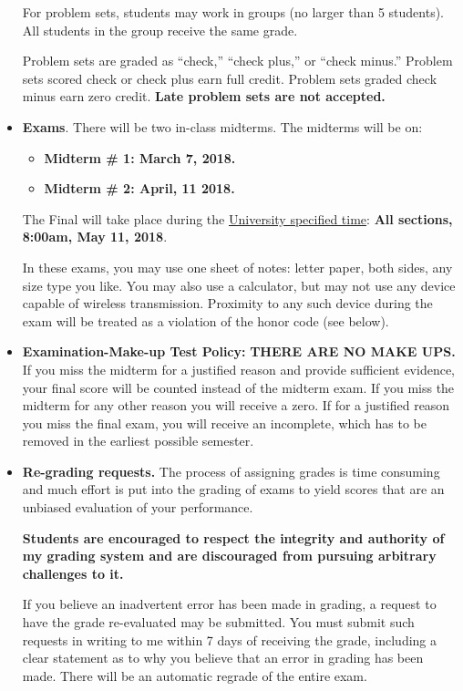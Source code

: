 \documentclass[12pt,pdftex,twoside,letterpaper]{exam}
\begin{document}
\begin{itemize}
    For problem sets, students may work in groups (no larger than 5 students). All students in the group receive the same grade.

    Problem sets are graded as ``check,'' ``check plus,'' or ``check minus.'' Problem sets scored check or check plus earn full credit. Problem sets graded check minus earn zero credit. \textbf{Late problem sets are not accepted.}

\item \textbf{Exams}. There will be two in-class midterms. The midterms will be on:
\begin{itemize}
\item\textbf{ Midterm \# 1: March 7, 2018.}
\item\textbf{ Midterm \# 2: April, 11 2018.}
\end{itemize}
The Final will take place during the \href{http://www.nyu.edu/registrar/pdf/Final_exam_schedule_Spring_2018.pdf}{University specified time}: \textbf{All sections, 8:00am, May 11, 2018}.

In these exams, you may use one sheet of notes: letter paper, both sides, any size type you like. You may also use a calculator, but may not use any device capable of wireless transmission.  Proximity to any such device during the exam will be treated as a violation of the honor code (see below).

\item \textbf{Examination-Make-up Test Policy:} \textbf{THERE ARE NO MAKE UPS.}\\

 If you miss the midterm for a justified reason and provide sufficient evidence, your final score will be counted instead of the midterm exam. If you miss the midterm for any other reason you will receive a zero. If for a justified reason you miss the final exam, you will receive an incomplete, which has to be removed in the earliest possible semester.

\item \textbf{Re-grading requests.} The process of assigning grades is time consuming and much effort is put into the grading of exams to yield scores that are an unbiased evaluation of your performance.

    \textbf{Students are encouraged to respect the integrity and authority of my grading system and are discouraged from pursuing arbitrary challenges to it.}

If you believe an inadvertent error has been made in grading, a request to have the grade re-evaluated may be submitted. You must submit such requests in writing to me within 7 days of receiving the grade, including a clear statement as to why you believe that an error in grading has been made. There will be an automatic regrade of the entire exam.

\end{itemize}
\end{document}
